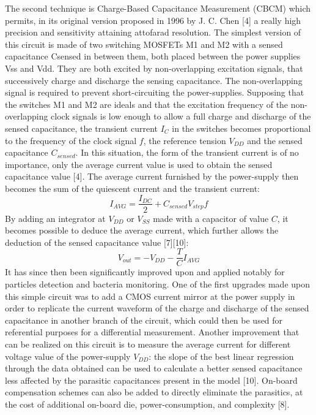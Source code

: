 The second technique is Charge-Based Capacitance Measurement (CBCM) which permits, in its original version proposed in 1996 by J. C. Chen [4] a really high precision and sensitivity attaining attofarad resolution. The simplest version of this circuit is made of two switching MOSFETs M1 and M2 with a sensed capacitance Csensed in between them, both placed between the power supplies Vss and Vdd.  They are both excited by non-overlapping excitation signals, that successively charge and discharge the sensing capacitance. The non-overlapping signal is required to prevent short-circuiting the power-supplies. Supposing that the switches M1 and M2 are ideals and that the excitation frequency of the non-overlapping clock signals is low enough to allow a full charge and discharge of the sensed capacitance, the transient current $I_C$ in the switches becomes proportional to the frequency of the clock signal $f$, the reference tension $V_{DD}$ and the sensed capacitance $C_{sensed}$. In this situation, the form of the transient current is of no importance, only the average current value is used to obtain the sensed capacitance value [4]. The average current furnished by the power-supply then becomes the sum of the quiescent current and the transient current:
\begin{equation}
   I_{AVG} = \frac{I_{DC}}{2} + C_{sensed} V_{step} f
\end{equation}
By adding an integrator at $V_{DD}$ or $V_{SS}$ made with a capacitor of value $C$, it becomes possible to deduce the average current, which further allows the deduction of the sensed capacitance value [7][10]: 
\begin{equation}
   V_{out} = -V_{DD} - \frac{T}{C} I_{AVG}
\end{equation}
It has since then been significantly improved upon and applied notably for particles detection and bacteria monitoring. One of the first upgrades made upon this simple circuit was to add a CMOS current mirror at the power supply in order to replicate the current waveform of the charge and discharge of the sensed capacitance in another branch of the circuit, which could then be used for referential purposes for a differential measurement. Another improvement that can be realized on this circuit is to measure the average current for different voltage value of the power-supply $V_{DD}$: the slope of the best linear regression through the data obtained can be used to calculate a better sensed capacitance less affected by the parasitic capacitances present in the model [10]. On-board compensation schemes can also be added to directly eliminate the parasitics, at the cost of additional on-board die, power-consumption, and complexity \cite{horowitz1989art}[8]. \par

